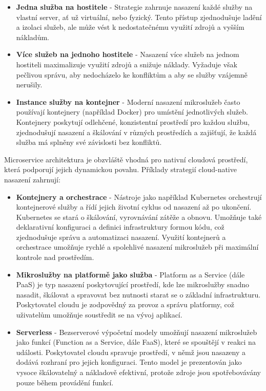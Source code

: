 \begin{itemize}
    \item \textbf{Jedna služba na hostitele} - Strategie zahrnuje nasazení každé služby na vlastní server, ať už virtuální, nebo fyzický. Tento přístup zjednodušuje ladění a izolaci služeb, ale může vést k nedostatečnému využití zdrojů a vyšším nákladům.
    \item \textbf{Více služeb na jednoho hostitele} - Nasazení více služeb na jednom hostiteli maximalizuje využití zdrojů a snižuje náklady. Vyžaduje však pečlivou správu, aby nedocházelo ke konfliktům a aby se služby vzájemně nerušily.
    \item \textbf{Instance služby na kontejner} - Moderní nasazení mikroslužeb často používají kontejnery (například Docker) pro umístění jednotlivých služeb. Kontejnery poskytují odlehčené, konzistentní prostředí pro každou službu, zjednodušují nasazení a škálování v různých prostředích a zajišťují, že každá služba má splněny své závislosti bez konfliktů.
\end{itemize}


Microservice architektura je obzvláště vhodná pro nativní cloudová prostředí, která podporují jejich dynamickou povahu. \cite{Garrison2017} Příklady strategií cloud-native nasazení zahrnují:

\begin{itemize}
    \item \textbf{Kontejnery a orchestrace} - Nástroje jako například Kubernetes orchestrují kontejnerové služby a řídí jejich životní cyklus od nasazení až po ukončení. Kubernetes se stará o škálování, vyrovnávání zátěže a obnovu. Umožňuje také deklarativní konfiguraci a  definici infrastruktury formou kódu, což zjednodušuje správu a automatizaci nasazení. Využití kontejnerů a orchestrace umožňuje rychlé a spolehlivé nasazení mikroslužeb při maximální kontrole nad prostředím.
    \item \textbf{Mikroslužby na platformě jako služba} - Platform as a Service (dále PaaS) je typ nasazení poskytovující prostředí, kde lze mikroslužby snadno nasadit, škálovat a spravovat bez nutnosti starat se o základní infrastrukturu. Poskytovatel cloudu je zodpovědný za provoz a správu platformy, což uživatelům umožňuje soustředit se na vývoj aplikací.
    \item \textbf{Serverless} - Bezserverové výpočetní modely umožňují nasazení mikroslužeb jako funkcí (Function as a Service, dále FaaS), které se spouštějí v reakci na události. Poskytovatel cloudu spravuje prostředí, v němž jsou nasazeny a dodává rozhraní pro jejich konfiguraci. Tento model je prezentován jako vysoce škálovatelný a nákladově efektivní, protože zdroje jsou spotřebovávány pouze během provádění funkcí. 
\end{itemize}